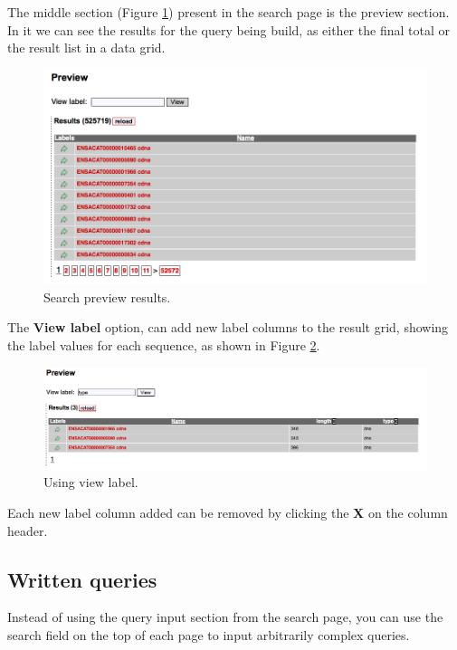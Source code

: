 The middle section (Figure \ref{fig:search3_man}) present in the search page is the preview section. In it
we can see the results for the query being build, as either the final total or the result list in a data grid.

\begin{figure}[H]
  \centering
    \includegraphics[scale=0.5]{search3.png}
  \caption{Search preview results.}
  \label{fig:search3_man}
\end{figure}

The \textbf{View label} option, can add new label columns to the result grid, showing the label
values for each sequence, as shown in Figure \ref{fig:view_label}.

\begin{figure}[H]
  \centering
    \includegraphics[scale=0.5]{view_label.png}
  \caption{Using view label.}
  \label{fig:view_label}
\end{figure}

Each new label column added can be removed by clicking the \textbf{X} on the column header.

\subsection{Written queries}

Instead of using the query input section from the search page, you can use the search field
on the top of each page to input arbitrarily complex queries.

